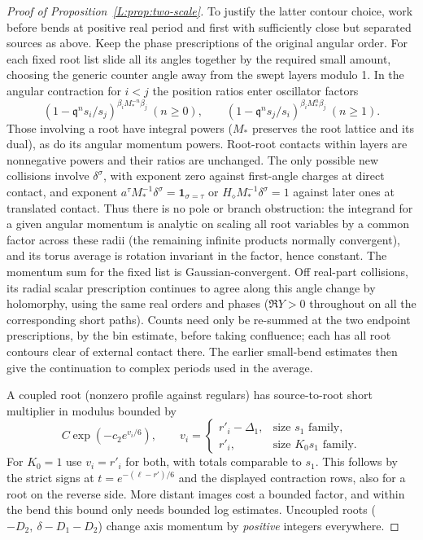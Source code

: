 \begin{proof}[Proof of Proposition~\ref{L:prop:two-scale}]
To justify the latter contour choice, work before bends at positive real period and first with sufficiently close but separated sources as above. Keep the phase prescriptions of the original angular order. For each fixed root list slide all its angles together by the required small amount, choosing the generic counter angle away from the swept layers modulo 1. In the angular contraction for \(i<j\) the position ratios enter oscillator factors
\[
 (1-\mathfrak q^n s_i/s_j)^{\beta_i M_*^{-n}\beta_j}\ (n\ge0),
 \qquad
 (1-\mathfrak q^n s_j/s_i)^{\beta_i M_*^n\beta_j}\ (n\ge1).
\]
Those involving a root have integral powers (\(M_*\) preserves the root lattice and its dual), as do its angular momentum powers. Root-root contacts within layers are nonnegative powers and their ratios are unchanged. The only possible new collisions involve \(\delta^\sigma\), with exponent zero against first-angle charges at direct contact, and exponent \(a^\tau M_*^{-1}\delta^\sigma=\mathbf1_{\sigma=\tau}\) or \(H_\diamond M_*^{-1}\delta^\sigma=1\) against later ones at translated contact. Thus there is no pole or branch obstruction: the integrand for a given angular momentum is analytic on scaling all root variables by a common factor across these radii (the remaining infinite products normally convergent), and its torus average is rotation invariant in the factor, hence constant. The momentum sum for the fixed list is Gaussian-convergent. Off real-part collisions, its radial scalar prescription continues to agree along this angle change by holomorphy, using the same real orders and phases (\(\Re Y>0\) throughout on all the corresponding short paths). Counts need only be re-summed at the two endpoint prescriptions, by the bin estimate, before taking confluence; each has all root contours clear of external contact there. The earlier small-bend estimates then give the continuation to complex periods used in the average.

A coupled root (nonzero profile against regulars) has source-to-root short multiplier in modulus bounded by
\[
 C\exp(-c_2 e^{v_i/6}),\qquad
 v_i=\begin{cases} r'_i-\Delta_1,&\text{size }s_1\text{ family},\\
                    r'_i,&\text{size }K_0s_1\text{ family}.
       \end{cases}
\]
For \(K_0=1\) use \(v_i=r'_i\) for both, with totals comparable to \(s_1\). This follows by the strict signs at \(t=e^{-(\ell-r')/6}\) and the displayed contraction rows, also for a root on the reverse side. More distant images cost a bounded factor, and within the bend this bound only needs bounded log estimates. Uncoupled roots (\(-D_2,\ \delta-D_1-D_2\)) change axis momentum by \emph{positive} integers everywhere.


\end{proof}
